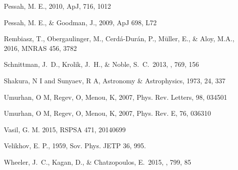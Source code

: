 \documentclass{emulateapj}
\begin{document}
\begin{thebibliography}{53}
Pessah, M. E., 2010, ApJ, 716, 1012

Pessah, M. E., \& Goodman, J., 2009, ApJ 698, L72 

Rembiasz, T., Obergaulinger, M., Cerd\'a-Dur\'an, P., M\"uller, E., \& Aloy, M.A., 2016, MNRAS 456, 3782

 Schnittman, J.~D., Krolik, J.~H., \& Noble, S.~C.\ 2013, \apj, 769, 156 

Shakura, N I and Sunyaev, R A, Astronomy \& Astrophysics, 1973, 24, 337

Umurhan, O M, Regev, O, Menou, K, 2007, Phys. Rev. Letters, 98, 034501

Umurhan, O M, Regev, O, Menou, K, 2007, Phys. Rev. E, 76, 036310

Vasil, G. M. 2015, RSPSA 471, 20140699

Velikhov, E. P., 1959, Sov. Phys. JETP 36, 995.

 Wheeler, J.~C., Kagan, D., \& Chatzopoulos, E.\ 2015, \apj, 799, 85 

\end{thebibliography}
\end{document}
